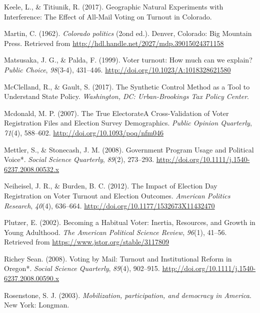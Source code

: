 \documentclass[12pt,twoside]{reedthesis}
\begin{document}
  \hypertarget{ref-keele_geographic_2017}{}
  Keele, L., \& Titiunik, R. (2017). Geographic Natural Experiments with
  Interference: The Effect of All-Mail Voting on Turnout in Colorado.
  
  \hypertarget{ref-martin_colorado_1962}{}
  Martin, C. (1962). \emph{Colorado politics} (2ond ed.). Denver,
  Colorado: Big Mountain Press. Retrieved from
  \url{http://hdl.handle.net/2027/mdp.39015024371158}
  
  \hypertarget{ref-matsusaka_voter_1999}{}
  Matsusaka, J. G., \& Palda, F. (1999). Voter turnout: How much can we
  explain? \emph{Public Choice}, \emph{98}(3-4), 431--446.
  \url{http://doi.org/10.1023/A:1018328621580}
  
  \hypertarget{ref-mcclelland_synthetic_2017}{}
  McClelland, R., \& Gault, S. (2017). The Synthetic Control Method as a
  Tool to Understand State Policy. \emph{Washington, DC: Urban-Brookings
  Tax Policy Center}.
  
  \hypertarget{ref-mcdonald_true_2007}{}
  Mcdonald, M. P. (2007). The True ElectorateA Cross-Validation of Voter
  Registration Files and Election Survey Demographics. \emph{Public
  Opinion Quarterly}, \emph{71}(4), 588--602.
  \url{http://doi.org/10.1093/poq/nfm046}
  
  \hypertarget{ref-mettler_government_2008}{}
  Mettler, S., \& Stonecash, J. M. (2008). Government Program Usage and
  Political Voice*. \emph{Social Science Quarterly}, \emph{89}(2),
  273--293. \url{http://doi.org/10.1111/j.1540-6237.2008.00532.x}
  
  \hypertarget{ref-neiheisel_impact_2012}{}
  Neiheisel, J. R., \& Burden, B. C. (2012). The Impact of Election Day
  Registration on Voter Turnout and Election Outcomes. \emph{American
  Politics Research}, \emph{40}(4), 636--664.
  \url{http://doi.org/10.1177/1532673X11432470}
  
  \hypertarget{ref-plutzer_becoming_2002}{}
  Plutzer, E. (2002). Becoming a Habitual Voter: Inertia, Resources, and
  Growth in Young Adulthood. \emph{The American Political Science Review},
  \emph{96}(1), 41--56. Retrieved from
  \url{https://www.jstor.org/stable/3117809}
  
  \hypertarget{ref-richey_sean_voting_2008}{}
  Richey Sean. (2008). Voting by Mail: Turnout and Institutional Reform in
  Oregon*. \emph{Social Science Quarterly}, \emph{89}(4), 902--915.
  \url{http://doi.org/10.1111/j.1540-6237.2008.00590.x}
  
  \hypertarget{ref-rosenstone_mobilization_2003}{}
  Rosenstone, S. J. (2003). \emph{Mobilization, participation, and
  democracy in America}. New York: Longman.
  
\end{document}
